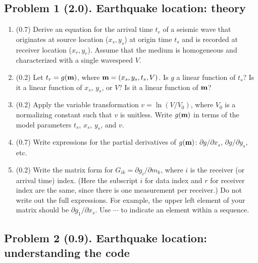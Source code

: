 \documentclass[11pt,titlepage,fleqn]{article}
\begin{document}

\subsection*{Problem 1 (2.0). Earthquake location: theory}

\begin{enumerate}
\item (0.7) Derive an equation for the arrival time $t_r$ of a seismic wave that originates at source location ($x_s, y_s$) at origin time $t_s$ and is recorded at receiver location ($x_r, y_r$). Assume that the medium is homogeneous and characterized with a single wavespeed $V$.

\item (0.2) Let $t_r = g(\mbox{${\bf m}$})$, where $\mbox{${\bf m}$} = (x_s,y_s,t_s,V)$.
Is $g$ a linear function of $t_s$? Is it a linear function of $x_s$, $y_s$, or $V$?
Is it a linear function of $\mbox{${\bf m}$}$?

\item (0.2) Apply the variable transformation $v = \ln(V/V_0)$, where $V_0$ is a normalizing constant such that $v$ is unitless. Write $g(\mbox{${\bf m}$})$ in terms of the model parameters $t_s$, $x_s$, $y_s$, and $v$.

\item (0.7) Write expressions for the partial derivatives of $g(\mbox{${\bf m}$})$: $\partial g/ \partial x_s$, $\partial g/ \partial y_s$, etc.

\item (0.2) Write the matrix form for $G_{ik} = \partial g_i/ \partial m_k$, where $i$ is the receiver (or arrival time) index. (Here the subscript $i$ for data index and $r$ for receiver index are the same, since there is one measurement per receiver.) Do not write out the full expressions.
For example, the upper left element of your matrix should be $\partial g_1/\partial x_s$.
Use $\cdots$ to indicate an element within a sequence.

\end{enumerate}


\pagebreak
\subsection*{Problem 2 (0.9). Earthquake location: understanding the code}
\end{document}
